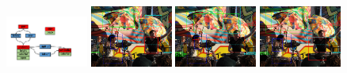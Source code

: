 \documentclass[runningheads]{llncs}
\begin{document}
\begin{figure}[H]
    \centering
    \includegraphics[width=2.7cm]{19_scene_graph.png}\hspace{0em}
    \includegraphics[width=2.7cm]{19_ind.png}\hspace{0em}
    \includegraphics[width=2.7cm]{19_joint.png}\hspace{0em} 
    \includegraphics[width=2.7cm]{19_opt.png}
    \vspace{0.0in}
    \centering
    \hspace{0em}
    \hspace{0em}

\end{figure}
\end{document}
